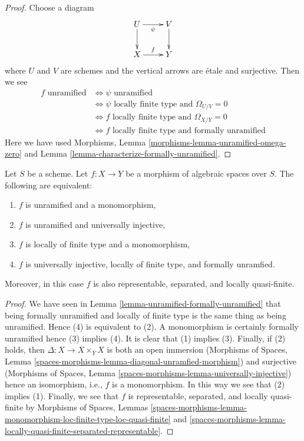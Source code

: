 \begin{proof}
Choose a diagram
$$
\xymatrix{
U \ar[d] \ar[r]_\psi & V \ar[d] \\
X \ar[r]^f & Y
}
$$
where $U$ and $V$ are schemes and the vertical arrows are \'etale and
surjective. Then we see
\begin{align*}
f\text{ unramified}
& \Leftrightarrow
\psi\text{ unramified} \\
& \Leftrightarrow
\psi\text{ locally finite type and }\Omega_{U/V} = 0 \\
& \Leftrightarrow
f\text{ locally finite type and }\Omega_{X/Y} = 0 \\
& \Leftrightarrow
f\text{ locally finite type and formally unramified}
\end{align*}
Here we have used 
Morphisms, Lemma \ref{morphisms-lemma-unramified-omega-zero} and
Lemma \ref{lemma-characterize-formally-unramified}.
\end{proof}

\begin{lemma}
\label{lemma-universally-injective-unramified}
Let $S$ be a scheme.
Let $f : X \to Y$ be a morphism of algebraic spaces over $S$.
The following are equivalent:
\begin{enumerate}
\item $f$ is unramified and a monomorphism,
\item $f$ is unramified and universally injective,
\item $f$ is locally of finite type and a monomorphism,
\item $f$ is universally injective, locally of finite type, and
formally unramfied.
\end{enumerate}
Moreover, in this case $f$ is also representable, separated, and
locally quasi-finite.
\end{lemma}

\begin{proof}
We have seen in
Lemma \ref{lemma-unramified-formally-unramified}
that being formally unramified and locally of finite type is the same thing
as being unramified.
Hence (4) is equivalent to (2).
A monomorphism is certainly formally unramified hence (3) implies (4).
It is clear that (1) implies (3). Finally, if (2) holds, then
$\Delta : X \to X \times_Y X$ is both an open immersion
(Morphisms of Spaces, Lemma
\ref{spaces-morphisms-lemma-diagonal-unramfied-morphism})
and surjective
(Morphisms of Spaces, Lemma
\ref{spaces-morphisms-lemma-universally-injective})
hence an isomorphism, i.e., $f$ is a monomorphism. In this way we see that
(2) implies (1).
Finally, we see that $f$ is representable, separated, and locally
quasi-finite by
Morphisms of Spaces, Lemmas
\ref{spaces-morphisms-lemma-monomorphism-loc-finite-type-loc-quasi-finite} and
\ref{spaces-morphisms-lemma-locally-quasi-finite-separated-representable}.
\end{proof}






